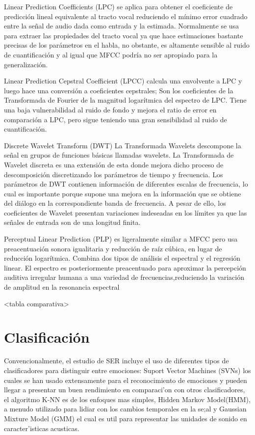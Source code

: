 \documentclass[11pt,a4paper,spanish]{book}
\begin{document}
		Linear Prediction Coefficients (LPC) se aplica para obtener el coeficiente de predicción lineal equivalente al tracto vocal reduciendo el mínimo error cuadrado entre la señal de audio dada como entrada y la estimada. Normalmente se usa para extraer las propiedades del tracto vocal ya que hace estimaciones bastante precisas de los parámetros en el habla, no obstante, es altamente sensible al ruido de cuantificación y al igual que MFCC podría no ser apropiado para la generalización.
		
		Linear Prediction Cepstral Coefficient (LPCC) calcula una envolvente a LPC y luego hace una conversión a coeficientes cepstrales; Son los coeficientes de la Transformada de Fourier de la magnitud logarítmica del espectro de LPC. Tiene una baja vulnerabilidad al ruido de fondo y mejora el ratio de error en comparación a LPC, pero sigue teniendo una gran sensibilidad al ruido de cuantificación.
		
		Discrete Wavelet Transform (DWT) La Transformada Wavelets descompone la señal en grupos de funciones básicas llamadas wavelets. La Transformada de Wavelet discreta es una extensión de esta donde mejora dicho proceso de descomposición discretizando los parámetros de tiempo y frecuencia. Los parámetros de DWT contienen información de diferentes escalas de frecuencia, lo cual es importante porque supone una mejora en la información que se obtiene del diálogo en la correspondiente banda de frecuencia. A pesar de ello, los coeficientes de Wavelet presentan variaciones indeseadas en los límites ya que las señales de entrada son de una longitud finita.
		
		Perceptual Linear Prediction (PLP) es ligeralmente similar a MFCC pero usa preacentuación sonora igualitaria y reducción de raíz cúbica, en lugar de reducción logarítmica. Combina dos tipos de análisis el espectral y el regresión linear. El espectro es posteriormente preacentuado para aproximar la percepción auditiva irregular humana a una variedad de frecuencias,reduciendo la variación de amplitud en la resonancia espectral
		
		<tabla comparativa>
		
		
		
		\section{Clasificación}
		Convencionalmente, el estudio de SER incluye el uso de diferentes tipos de clasificadores para distinguir entre emociones: Suport Vector Machines (SVNs) los cuales se han usado extensamente para el reconocimiento de emociones y pueden llegar a presentar un buen rendimiento en comparaci'on con otros clasificadores, el algoritmo K-NN es de los enfoques mas simples, Hidden Markov Model(HMM), a menudo utilizado para lidiar con los cambios temporales en la se;al y Gaussian Mixture Model (GMM) el cual es util para representar las unidades de sonido en caracter'isticas acusticas\cite{Farooq2020}.
		
\end{document}
